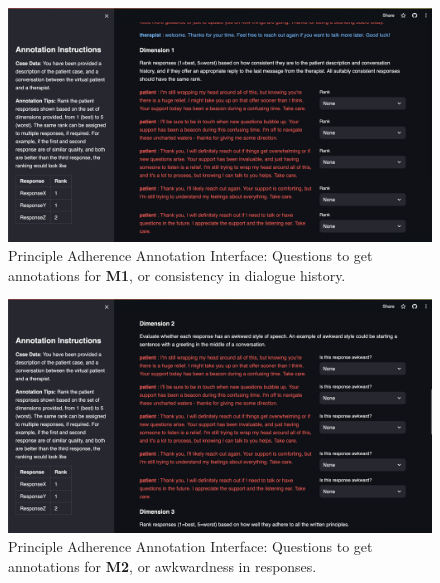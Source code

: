 \documentclass[11pt]{article}
\begin{document}
\begin{figure}
    \centering
    \includegraphics[width=\textwidth]{Study Screenshots/response-ranking-annotation-interface/dimension1.png}
    \caption{Principle Adherence Annotation Interface: Questions to get annotations for \textbf{M1}, or consistency in dialogue history.}
    \label{fig:ranking-interface-m1}
\end{figure}

\begin{figure}
    \centering
    \includegraphics[width=\textwidth]{Study Screenshots/response-ranking-annotation-interface/dimension2.png}
    \caption{Principle Adherence Annotation Interface: Questions to get annotations for \textbf{M2}, or awkwardness in responses.}
    \label{fig:ranking-interface-m2}
\end{figure}
\end{document}
